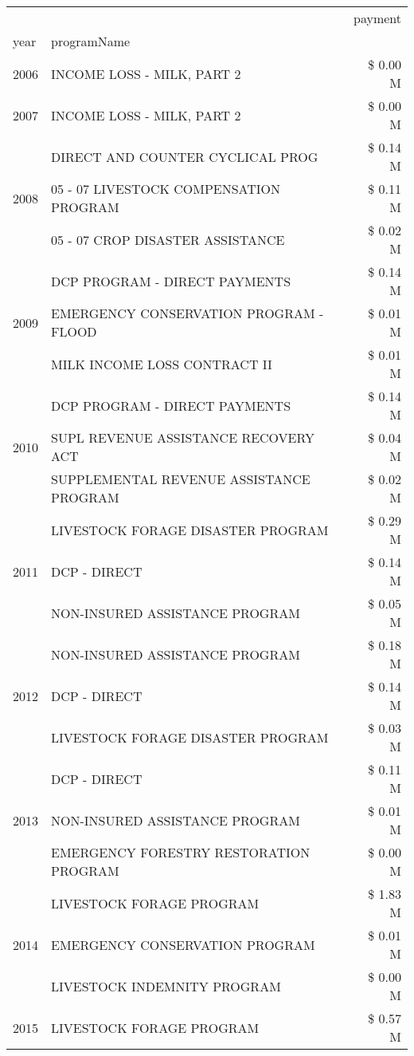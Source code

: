 \begin{tabular}{llr}
\toprule
 &  & payment \\
year & programName &  \\
\midrule
2006 & INCOME LOSS - MILK, PART 2 & \$ 0.00 M \\
\cline{1-3}
2007 & INCOME LOSS - MILK, PART 2 & \$ 0.00 M \\
\cline{1-3}
\multirow[t]{3}{*}{2008} & DIRECT AND COUNTER CYCLICAL PROG & \$ 0.14 M \\
 & 05 - 07 LIVESTOCK COMPENSATION PROGRAM & \$ 0.11 M \\
 & 05 - 07 CROP DISASTER ASSISTANCE & \$ 0.02 M \\
\cline{1-3}
\multirow[t]{3}{*}{2009} & DCP PROGRAM - DIRECT PAYMENTS & \$ 0.14 M \\
 & EMERGENCY CONSERVATION PROGRAM - FLOOD & \$ 0.01 M \\
 & MILK INCOME LOSS CONTRACT II & \$ 0.01 M \\
\cline{1-3}
\multirow[t]{3}{*}{2010} & DCP PROGRAM - DIRECT PAYMENTS & \$ 0.14 M \\
 & SUPL REVENUE ASSISTANCE RECOVERY ACT & \$ 0.04 M \\
 & SUPPLEMENTAL REVENUE ASSISTANCE PROGRAM & \$ 0.02 M \\
\cline{1-3}
\multirow[t]{3}{*}{2011} & LIVESTOCK FORAGE DISASTER PROGRAM & \$ 0.29 M \\
 & DCP - DIRECT & \$ 0.14 M \\
 & NON-INSURED ASSISTANCE PROGRAM & \$ 0.05 M \\
\cline{1-3}
\multirow[t]{3}{*}{2012} & NON-INSURED ASSISTANCE PROGRAM & \$ 0.18 M \\
 & DCP - DIRECT & \$ 0.14 M \\
 & LIVESTOCK FORAGE DISASTER PROGRAM & \$ 0.03 M \\
\cline{1-3}
\multirow[t]{3}{*}{2013} & DCP - DIRECT & \$ 0.11 M \\
 & NON-INSURED ASSISTANCE PROGRAM & \$ 0.01 M \\
 & EMERGENCY FORESTRY RESTORATION PROGRAM & \$ 0.00 M \\
\cline{1-3}
\multirow[t]{3}{*}{2014} & LIVESTOCK FORAGE PROGRAM & \$ 1.83 M \\
 & EMERGENCY CONSERVATION PROGRAM & \$ 0.01 M \\
 & LIVESTOCK INDEMNITY PROGRAM & \$ 0.00 M \\
\cline{1-3}
\multirow[t]{3}{*}{2015} & LIVESTOCK FORAGE PROGRAM & \$ 0.57 M \\

\end{tabular}
